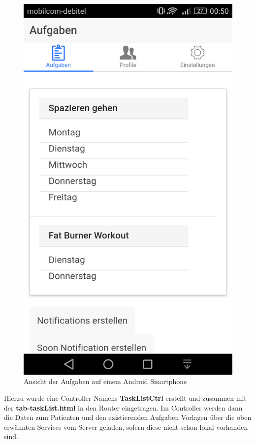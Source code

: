 \begin{figure}[H]
	\centering
	\includegraphics[scale=0.25]{images/Screenshots/PatientClient/AufgabenUebersicht}
	\caption[Ansicht der Aufgaben auf einem Android Smartphone]{Ansicht der Aufgaben auf einem Android Smartphone}
	\label{PatientClient_AufgabenUebersicht}
\end{figure}

Hierzu wurde eine Controller Namens \textbf{TaskListCtrl} erstellt und zusammen mit der \textbf{tab-taskList.html} in den Router eingetragen. Im Controller werden dann die Daten zum Patienten und den existierenden Aufgaben Vorlagen über die oben erwähnten Services vom Server geladen, sofern diese nicht schon lokal vorhanden sind.

